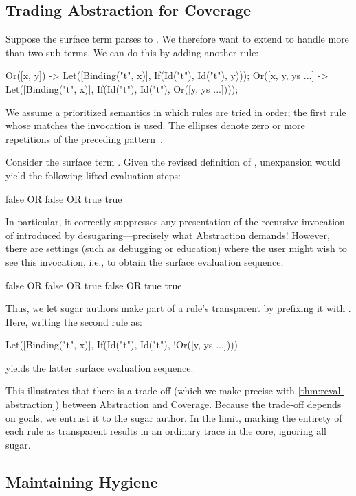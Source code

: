 \subsection{Trading Abstraction for Coverage}
\label{sec:reval-trading}

Suppose the surface term  parses to
. We therefore want to extend 
to handle more than two sub-terms.  We can do this by adding another
rule:
\begin{Codes}
Or([x, y]) ->
  Let([Binding("t", x)],
      If(Id("t"), Id("t"), y)));
Or([x, y, ys ...] ->
  Let([Binding("t", x)],
      If(Id("t"), Id("t"), Or([y, ys ...])));
\end{Codes}
We assume a prioritized semantics in which rules are tried in
order; the first rule whose  matches the invocation is
used. The ellipses denote zero or more repetitions
of the preceding pattern~\cite{macro-by-example}.

Consider the surface term . 
Given the revised definition of , unexpansion would yield the
following lifted evaluation steps:
\begin{Codes}
    false OR false OR true
\SurfStep true
\end{Codes}
In particular, it correctly suppresses any presentation of the recursive
invocation of 
introduced by desugaring---precisely what Abstraction demands!
However, there are settings
(such as debugging or education) where the user might wish to see this
invocation, i.e., to obtain the surface evaluation sequence:
\begin{Codes}
    false OR false OR true
\SurfStep false OR true
\SurfStep true
\end{Codes}
Thus, we let sugar authors make part of a rule's 
transparent by prefixing it with \Code{!}. Here, writing the second
 rule as:
\begin{Codes}
Let([Binding("t", x)],
    If(Id("t"), Id("t"), !Or([y, ys ...])))
\end{Codes}
yields the latter surface evaluation sequence.

This illustrates that there is a trade-off (which we make precise with
\cref{thm:reval-abstraction}) between Abstraction and Coverage.
Because the trade-off depends on
goals, we entrust it to the sugar author.  In the limit,
marking the entirety of each rule as transparent results in
an ordinary trace in the core, ignoring all sugar.

\subsection{Maintaining Hygiene}

